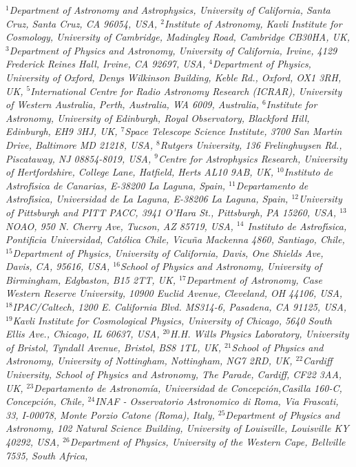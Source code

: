 {\justify\it\small
$^{1}$Department of Astronomy and Astrophysics, University of California, Santa Cruz, Santa Cruz, CA 96054, USA,
$^{2}$Institute of Astronomy, Kavli Institute for Cosmology, University of Cambridge, Madingley Road, Cambridge CB30HA, UK,
$^{3}$Department of Physics and Astronomy, University of California, Irvine, 4129 Frederick Reines Hall, Irvine, CA 92697, USA,
$^{4}$Department of Physics, University of Oxford, Denys Wilkinson Building, Keble Rd., Oxford, OX1 3RH, UK,
$^{5}$International Centre for Radio Astronomy Research (ICRAR), University of Western Australia, Perth, Australia, WA 6009, Australia,
$^{6}$Institute for Astronomy, University of Edinburgh, Royal Observatory, Blackford Hill, Edinburgh, EH9 3HJ, UK,
$^{7}$Space Telescope Science Institute, 3700 San Martin Drive, Baltimore MD 21218, USA,
$^{8}$Rutgers University, 136 Frelinghuysen Rd., Piscataway, NJ 08854-8019, USA,
$^{9}$Centre for Astrophysics Research, University of Hertfordshire, College Lane, Hatfield, Herts AL10 9AB, UK,
$^{10}$Instituto de Astrof\'\i sica de Canarias, E-38200 La Laguna, Spain,
$^{11}$Departamento de Astrof\'\i sica, Universidad de La Laguna, E-38206 La Laguna, Spain,
$^{12}$University of Pittsburgh and PITT PACC, 3941 O{'}Hara St., Pittsburgh, PA 15260, USA,
$^{13}$NOAO, 950 N. Cherry Ave, Tucson, AZ 85719, USA,
$^{14}$ Instituto de Astrof\'\i sica, Pontificia Universidad,
Cat{\'{o}}lica Chile, Vicu{\~{n}}a Mackenna 4860, Santiago, Chile,
$^{15}$Department of Physics, University of California, Davis, One Shields Ave, Davis, CA, 95616, USA,
$^{16}$School of Physics and Astronomy, University of Birmingham, Edgbaston, B15 2TT, UK,
$^{17}$Department of Astronomy, Case Western Reserve University, 10900 Euclid Avenue, Cleveland, OH 44106, USA,
$^{18}$IPAC/Caltech, 1200 E. California Blvd. MS314-6, Pasadena, CA 91125, USA,
$^{19}$Kavli Institute for Cosmological Physics, University of Chicago, 5640 South Ellis Ave., Chicago, IL 60637, USA,
$^{20}$H.H. Wills Physics Laboratory, University of Bristol, Tyndall Avenue, Bristol, BS8 1TL, UK,
$^{21}$School of Physics and Astronomy, University of Nottingham, Nottingham, NG7 2RD, UK,
$^{22}$Cardiff University, School of Physics and Astronomy, The Parade, Cardiff, CF22 3AA, UK,
$^{23}$Departamento de Astronomía, Universidad de Concepci{\'{o}}n,Casilla 160-C, Concepción, Chile,
$^{24}$INAF - Osservatorio Astronomico di Roma, Via Frascati, 33, I-00078, Monte Porzio Catone (Roma), Italy,
$^{25}$Department of Physics and Astronomy, 102 Natural Science Building, University of Louisville, Louisville KY 40292, USA,
$^{26}$Department of Physics, University of the Western Cape, Bellville 7535, South Africa,
}
